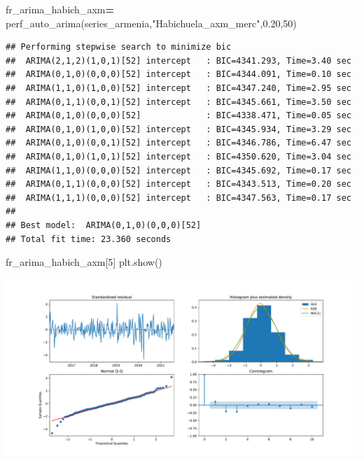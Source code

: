 \documentclass[
]{book}
\newenvironment{Shaded}{\begin{snugshade}}{\end{snugshade}}
\newcommand{\DecValTok}[1]{\textcolor[rgb]{0.00,0.00,0.81}{#1}}
\newcommand{\FloatTok}[1]{\textcolor[rgb]{0.00,0.00,0.81}{#1}}
\newcommand{\NormalTok}[1]{#1}
\newcommand{\OperatorTok}[1]{\textcolor[rgb]{0.81,0.36,0.00}{\textbf{#1}}}
\newcommand{\StringTok}[1]{\textcolor[rgb]{0.31,0.60,0.02}{#1}}
\begin{document}
\begin{Shaded}
\begin{Highlighting}[]

\NormalTok{fr\_arima\_habich\_axm}\OperatorTok{=}\NormalTok{ perf\_auto\_arima(series\_armenia,}\StringTok{"Habichuela\_axm\_merc"}\NormalTok{,}\FloatTok{0.20}\NormalTok{,}\DecValTok{50}\NormalTok{)}
\end{Highlighting}
\end{Shaded}

\begin{verbatim}
## Performing stepwise search to minimize bic
##  ARIMA(2,1,2)(1,0,1)[52] intercept   : BIC=4341.293, Time=3.40 sec
##  ARIMA(0,1,0)(0,0,0)[52] intercept   : BIC=4344.091, Time=0.10 sec
##  ARIMA(1,1,0)(1,0,0)[52] intercept   : BIC=4347.240, Time=2.95 sec
##  ARIMA(0,1,1)(0,0,1)[52] intercept   : BIC=4345.661, Time=3.50 sec
##  ARIMA(0,1,0)(0,0,0)[52]             : BIC=4338.471, Time=0.05 sec
##  ARIMA(0,1,0)(1,0,0)[52] intercept   : BIC=4345.934, Time=3.29 sec
##  ARIMA(0,1,0)(0,0,1)[52] intercept   : BIC=4346.786, Time=6.47 sec
##  ARIMA(0,1,0)(1,0,1)[52] intercept   : BIC=4350.620, Time=3.04 sec
##  ARIMA(1,1,0)(0,0,0)[52] intercept   : BIC=4345.692, Time=0.17 sec
##  ARIMA(0,1,1)(0,0,0)[52] intercept   : BIC=4343.513, Time=0.20 sec
##  ARIMA(1,1,1)(0,0,0)[52] intercept   : BIC=4347.563, Time=0.17 sec
## 
## Best model:  ARIMA(0,1,0)(0,0,0)[52]          
## Total fit time: 23.360 seconds
\end{verbatim}

\begin{Shaded}
\begin{Highlighting}[]
\NormalTok{fr\_arima\_habich\_axm[}\DecValTok{5}\NormalTok{]}
\NormalTok{plt.show()}
\end{Highlighting}
\end{Shaded}

\includegraphics{bookdown-demo_files/figure-latex/unnamed-chunk-154-143.pdf}
\end{document}
